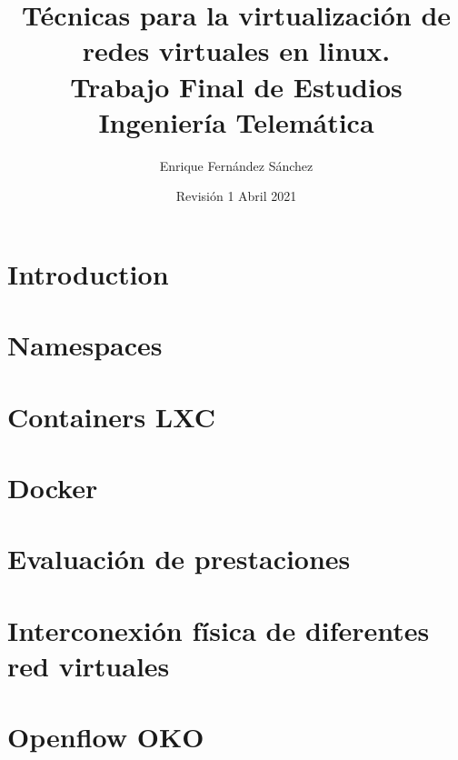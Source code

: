 \documentclass[12pt]{article}
\begin{document}
	\title{Técnicas para la virtualización de redes virtuales en linux. \\ \large Trabajo Final de Estudios \\ \large Ingeniería Telemática}
	\author{Enrique Fernández Sánchez}
	
	\date{Revisión 1 Abril 2021}
	
	\maketitle
	\tableofcontents
	
	\pagebreak
	
	\section{Introduction}
	
	\pagebreak
	
	\section{Namespaces}
	\section{Containers LXC}
	\section{Docker}
	\section{Evaluación de prestaciones}
	\section{Interconexión física de diferentes red virtuales}
	\section{Openflow OKO}
\end{document}
